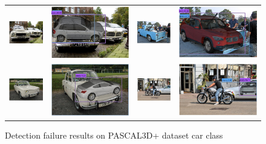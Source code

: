 \documentclass[10pt,twocolumn,letterpaper]{article}
\begin{document}
\begin{figure}[h]
\begin{tabular}{|cc|cc|}
  \includegraphics[width=0.22\linewidth]{supp/pas_car14a.png} &
  \includegraphics[width=0.22\linewidth]{supp/pas_car14b.png} & 
  \includegraphics[width=0.22\linewidth]{supp/pas_car15a.png} &
  \includegraphics[width=0.22\linewidth]{supp/pas_car15.png} \\ 
  \includegraphics[width=0.22\linewidth]{supp/pas_car20a.png} &
  \includegraphics[width=0.22\linewidth]{supp/pas_car20b.png} &
  \includegraphics[width=0.22\linewidth]{supp/pas_car23a.png} &
  \includegraphics[width=0.22\linewidth]{supp/pas_car23b.png} \\
  \hline
  \end{tabular}
\caption{Detection failure results on PASCAL3D+ dataset car class}%
  \label{fig:pascal3d_car_bad}
\end{figure}
\end{document}
